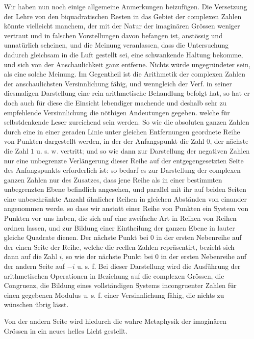 Wir haben nun noch einige allgemeine Anmerkungen beizufügen. Die Versetzung der Lehre von den biquadratischen Resten in das Gebiet der complexen Zahlen könnte vielleicht manchem, der mit der Natur der imaginären Grössen weniger vertraut und in falschen Vorstellungen davon befangen ist, anstössig und unnatürlich scheinen, und die Meinung veranlassen, dass die Untersuchung dadurch gleichsam in die Luft gestellt sei, eine schwankende Haltung bekomme, und sich von der Anschaulichkeit ganz entferne. Nichts würde ungegründeter sein, als eine solche Meinung. Im Gegentheil ist die Arithmetik der complexen Zahlen der anschaulichsten Versinnlichung fähig, und wenngleich der Verf. in seiner diesmaligen Darstellung eine rein arithmetische Behandlung befolgt hat, so hat er doch auch für diese die Einsicht lebendiger machende und deshalb sehr zu empfehlende Versinnlichung die nöthigen Andeutungen gegeben. welche für selbstdenkende Leser zureichend sein werden. So wie die absoluten ganzen Zahlen durch eine in einer geraden Linie unter gleichen Entfernungen geordnete Reihe von Punkten dargestellt werden, in der der Anfangspunkt die Zahl $0$, der nächste die Zahl $1$ u. s. w. vertritt; und so wie dann zur Darstellung der negativen Zahlen nur eine unbegrenzte Verlängerung dieser Reihe auf der entgegengesetzten Seite des Anfangspunkts erforderlich ist: so bedarf es zur Darstellung der complexen ganzen Zahlen nur des Zusatzes, dass jene Reihe als in einer bestimmten unbegrenzten Ebene befindlich angesehen, und parallel mit ihr auf beiden Seiten eine unbeschränkte Anzahl ähnlicher Reihen in gleichen Abständen von einander angenommen werde, so dass wir anstatt einer Reihe von Punkten ein System von Punkten vor uns haben, die sich auf eine zweifache Art in Reihen von Reihen ordnen lassen, und zur Bildung einer Eintheilung der ganzen Ebene in lauter gleiche Quadrate dienen. Der nächste Punkt bei $0$ in der ersten Nebenreihe auf der einen Seite der Reihe, welche die reellen Zahlen repräsentirt, bezieht sich dann auf die Zahl $i$, so wie der nächste Punkt bei $0$ in der ersten Nebenreihe auf der andern Seite auf $-i$ u. s. f. Bei dieser Darstellung wird die Ausführung der arithmetischen Operationen in Beziehung auf die complexen Grössen, die Congruenz, die Bildung eines vollständigen Systems incongruenter Zahlen für einen gegebenen Modulus u. s. f. einer Versinnlichung fähig, die nichts zu wünschen übrig lässt.

%
Von der andern Seite wird hiedurch die wahre Metaphysik der imaginären Grössen in ein neues helles Licht gestellt.

